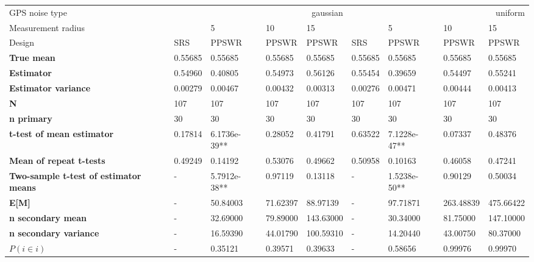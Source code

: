 \begin{tabular}{lllllllll}
\toprule
GPS noise type & \multicolumn{4}{r}{gaussian} & \multicolumn{4}{r}{uniform} \\
Measurement radius &  & 5 & 10 & 15 &  & 5 & 10 & 15 \\
Design & SRS & PPSWR & PPSWR & PPSWR & SRS & PPSWR & PPSWR & PPSWR \\
\midrule
\textbf{True mean} &  0.55685 &  0.55685 &  0.55685 &  0.55685 &  0.55685 &  0.55685 &  0.55685 &  0.55685 \\
\textbf{Estimator} & 0.54960 & 0.40805 & 0.54973 & 0.56126 & 0.55454 & 0.39659 & 0.54497 & 0.55241 \\
\textbf{Estimator variance} & 0.00279 & 0.00467 & 0.00432 & 0.00313 & 0.00276 & 0.00471 & 0.00444 & 0.00413 \\
\textbf{N} & 107 & 107 & 107 & 107 & 107 & 107 & 107 & 107 \\
\textbf{n primary} & 30 & 30 & 30 & 30 & 30 & 30 & 30 & 30 \\
\textbf{t-test of mean estimator} & 0.17814 & 6.1736e-39** & 0.28052 & 0.41791 & 0.63522 & 7.1228e-47** & 0.07337 & 0.48376 \\
\textbf{Mean of repeat t-tests} & 0.49249 & 0.14192 & 0.53076 & 0.49662 & 0.50958 & 0.10163 & 0.46058 & 0.47241 \\
\textbf{Two-sample t-test of estimator means} & - & 5.7912e-38** & 0.97119 & 0.13118 & - & 1.5238e-50** & 0.90129 & 0.50034 \\
\textbf{E[M]} & - & 50.84003 & 71.62397 & 88.97139 & - & 97.71871 & 263.48839 & 475.66422 \\
\textbf{n secondary mean} & - & 32.69000 & 79.89000 & 143.63000 & - & 30.34000 & 81.75000 & 147.10000 \\
\textbf{n secondary variance} & - & 16.59390 & 44.01790 & 100.59310 & - & 14.20440 & 43.00750 & 80.37000 \\
\textbf{$P(i \in i)$} & - & 0.35121 & 0.39571 & 0.39633 & - & 0.58656 & 0.99976 & 0.99970 \\
\bottomrule
\end{tabular}
